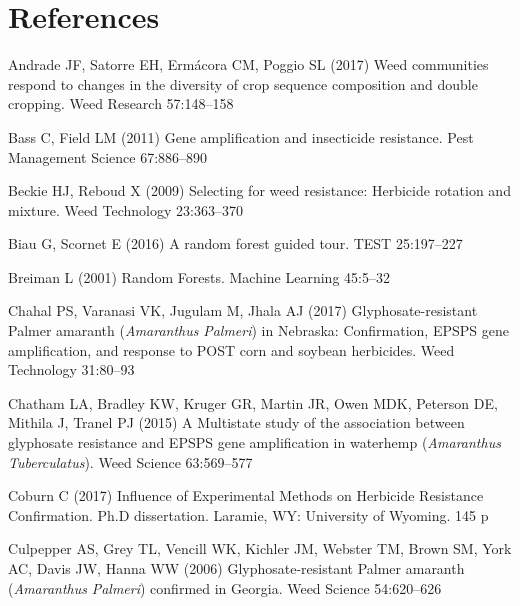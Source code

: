 \documentclass[
  12pt,
  a4paper]{article}
\begin{document}
\hypertarget{references}{%
\section*{References}\label{references}}

\hypertarget{refs}{}
\leavevmode\hypertarget{ref-andrade_weed_2017}{}%
Andrade JF, Satorre EH, Ermácora CM, Poggio SL (2017) Weed communities
respond to changes in the diversity of crop sequence composition and
double cropping. Weed Research 57:148--158

\leavevmode\hypertarget{ref-bass_gene_2011}{}%
Bass C, Field LM (2011) Gene amplification and insecticide resistance.
Pest Management Science 67:886--890

\leavevmode\hypertarget{ref-beckie_selecting_2009}{}%
Beckie HJ, Reboud X (2009) Selecting for weed resistance: Herbicide
rotation and mixture. Weed Technology 23:363--370

\leavevmode\hypertarget{ref-biau_random_2016}{}%
Biau G, Scornet E (2016) A random forest guided tour. TEST 25:197--227

\leavevmode\hypertarget{ref-breiman_random_2001}{}%
Breiman L (2001) Random Forests. Machine Learning 45:5--32

\leavevmode\hypertarget{ref-chahal_glyphosate-resistant_2017}{}%
Chahal PS, Varanasi VK, Jugulam M, Jhala AJ (2017) Glyphosate-resistant
Palmer amaranth (\emph{Amaranthus} \emph{Palmeri}) in Nebraska:
Confirmation, EPSPS gene amplification, and response to POST corn and
soybean herbicides. Weed Technology 31:80--93

\leavevmode\hypertarget{ref-chatham_multistate_2015}{}%
Chatham LA, Bradley KW, Kruger GR, Martin JR, Owen MDK, Peterson DE,
Mithila J, Tranel PJ (2015) A Multistate study of the association
between glyphosate resistance and EPSPS gene amplification in waterhemp
(\emph{Amaranthus} \emph{Tuberculatus}). Weed Science 63:569--577

\leavevmode\hypertarget{ref-coburn_influence_2017}{}%
Coburn C (2017) Influence of Experimental Methods on Herbicide
Resistance Confirmation. Ph.D dissertation. Laramie, WY: University of
Wyoming. 145 p

\leavevmode\hypertarget{ref-culpepper_glyphosate-resistant_2006}{}%
Culpepper AS, Grey TL, Vencill WK, Kichler JM, Webster TM, Brown SM,
York AC, Davis JW, Hanna WW (2006) Glyphosate-resistant Palmer amaranth
(\emph{Amaranthus} \emph{Palmeri}) confirmed in Georgia. Weed Science
54:620--626
\end{document}
